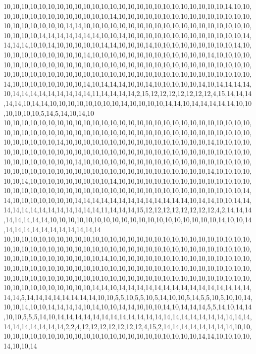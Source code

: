 10,10,10,10,10,10,10,10,10,10,10,10,10,10,10,10,10,10,10,10,10,10,10,10,10,14,10,10,10,10,10,10,10,10,10,10,10,10,10,10,14,10,10,10,10,10,10,10,10,10,10,10,10,10,10,10,10,10,10,10,10,10,10,14,14,10,10,10,10,10,10,10,10,10,10,10,10,10,10,10,10,10,10,10,10,10,10,10,14,14,14,14,14,14,14,10,10,14,10,10,10,10,10,10,10,10,10,10,10,10,10,14,14,14,14,10,10,14,10,10,10,10,10,14,14,10,10,10,14,10,10,10,10,10,10,10,10,10,14,10,10,10,10,10,10,10,10,10,10,14,10,10,10,10,10,10,10,10,10,10,10,10,10,14,10,10,10,10,10,10,10,10,10,10,10,10,10,10,10,10,10,10,10,10,10,10,10,10,10,10,10,10,10,10,10,10,10,10,10,10,10,10,10,10,10,10,10,10,10,10,10,10,10,10,10,10,10,10,10,10,10,10,10,10,14,10,10,10,10,10,10,10,10,14,10,14,14,14,10,10,14,10,10,10,10,10,14,10,14,14,14,14,10,14,14,14,14,14,14,14,14,14,11,14,14,14,14,2,15,12,12,12,12,12,12,12,4,15,14,14,14,14,14,10,14,14,10,10,10,10,10,10,10,10,14,10,10,10,10,14,14,10,14,14,14,14,14,10,10,10,10,10,10,5,14,5,14,10,14,10
10,10,10,10,10,10,10,10,10,10,10,10,10,10,10,10,10,10,10,10,10,10,10,10,10,10,10,10,10,10,10,10,10,10,10,10,10,10,10,10,10,10,10,10,10,10,10,10,10,10,10,10,10,10,10,10,10,10,10,10,10,10,14,10,10,10,10,10,10,10,10,10,10,10,10,10,10,10,10,14,10,10,10,10,10,10,10,10,10,10,10,10,10,10,10,10,10,10,10,10,10,10,10,10,10,10,10,10,10,10,10,10,10,10,10,10,10,10,10,10,14,10,10,10,10,10,10,10,10,10,10,10,10,10,10,10,10,10,10,10,10,10,10,10,10,10,10,10,10,10,10,10,10,10,10,10,10,10,10,10,10,10,10,14,10,10,10,10,10,10,14,10,10,10,10,10,10,10,10,10,14,10,10,10,10,10,10,10,10,10,10,10,10,10,10,10,10,10,10,10,10,10,10,10,10,10,10,10,10,10,10,10,10,10,10,10,10,10,10,10,10,10,10,14,14,10,10,10,10,10,10,10,14,14,14,14,14,14,14,14,14,14,14,14,14,10,14,14,10,10,14,14,14,14,14,14,14,14,14,14,14,14,14,11,14,14,14,15,12,12,12,12,12,12,12,12,4,2,14,14,14,14,14,14,14,14,10,10,10,10,10,10,10,10,10,10,10,10,10,10,10,10,10,10,10,14,10,10,14,14,14,14,14,14,14,14,14,14,14,14
10,10,10,10,10,10,10,10,10,10,10,10,10,10,10,10,10,10,10,10,10,10,10,10,10,10,10,10,10,10,10,10,10,10,10,10,10,10,10,10,10,10,10,10,10,10,10,10,10,10,10,10,10,10,10,10,10,10,10,10,10,10,10,10,10,10,10,14,10,10,10,10,10,10,10,10,10,10,10,10,10,10,10,10,10,10,10,10,10,10,10,10,10,10,10,10,10,10,10,10,10,10,10,10,10,10,10,10,10,10,10,10,10,10,10,10,10,10,10,10,10,10,10,10,10,10,10,10,10,10,10,10,10,10,10,10,10,10,10,10,10,10,10,10,10,10,10,10,10,10,14,14,10,14,14,14,14,14,14,14,14,14,14,14,14,14,14,14,14,14,5,14,14,14,14,14,14,14,14,10,10,5,5,10,5,5,10,5,14,10,10,5,14,5,5,10,5,10,10,14,10,10,14,10,10,14,14,14,14,10,14,10,10,14,14,10,10,10,14,10,14,14,14,5,5,14,10,14,14,10,10,5,5,5,14,10,14,14,14,14,14,14,14,14,14,14,14,14,14,14,14,14,14,14,14,14,14,14,14,14,14,14,14,14,14,2,2,4,12,12,12,12,12,12,12,4,15,2,14,14,14,14,14,14,14,14,10,10,10,10,10,10,10,10,10,10,10,10,10,10,10,10,10,10,10,10,10,10,10,10,14,14,10,10,10,10,14,10,10,14
